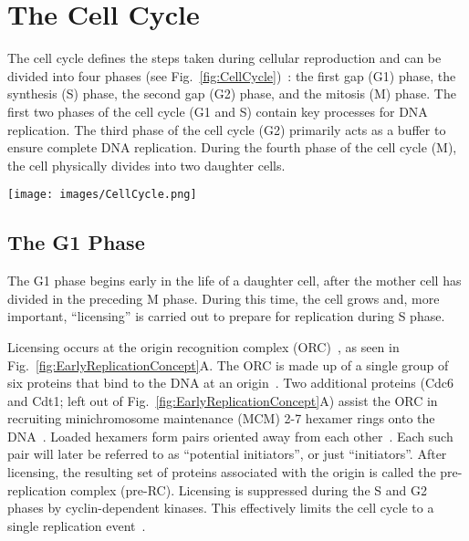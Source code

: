 	\section{The Cell Cycle}
	\label{sec:CellCycle}
	
	The cell cycle defines the steps taken during cellular reproduction and can be divided into four phases (see Fig.~\ref{fig:CellCycle})~\cite{MolecularCellBiology,CellMolApproach}:
	the first gap (G1) phase, the synthesis (S) phase, the second gap (G2) phase, and the mitosis (M) phase.
	The first two phases of the cell cycle (G1 and S) contain key processes for DNA replication.
	The third phase of the cell cycle (G2) primarily acts as a buffer to ensure complete DNA replication.
	During the fourth phase of the cell cycle (M), the cell physically divides into two daughter cells.
	
	\begin{SCfigure}[1][thb]
		\texttt{[image: images/CellCycle.png]}
		\caption[Cell Cycle]{\label{fig:CellCycle} The cell cycle has four phases: 
			Mitosis (M), when a mother cell separates into two daughter cells; 
			the first Gap (G1), when the daughter cell undergoes growth and chemical preparation for DNA replication;
			Synthesis (S), when the DNA is replicated;
			and the second Gap (G2), which acts as a buffer to ensure complete replication before the M phase.}
	\end{SCfigure}
	
	
		\subsection{The G1 Phase}
		\label{subsec:G1Phase}
		
		The G1 phase begins early in the life of a daughter cell, after the mother cell has divided in the preceding M phase.
		During this time, the cell grows and, more important, ``licensing'' is carried out to prepare for replication during S phase.
		
		Licensing occurs at the origin recognition complex (ORC)~\cite{DNAInitiation}, as seen in Fig.~\ref{fig:EarlyReplicationConcept}A.
		The ORC is made up of a single group of six proteins that bind to the DNA at an origin~\cite{ORC}.
		Two additional proteins (Cdc6 and Cdt1; left out of Fig.~\ref{fig:EarlyReplicationConcept}A) assist the ORC in recruiting minichromosome maintenance (MCM) 2-7 hexamer rings onto the DNA~\cite{DNARepInitiation}.
		Loaded hexamers form pairs oriented away from each other~\cite{MCMPairs}.
		Each such pair will later be referred to as ``potential initiators'', or just ``initiators''.
		After licensing, the resulting set of proteins associated with the origin is called the pre-replication complex (pre-RC).
		Licensing is suppressed during the S and G2 phases by cyclin-dependent kinases.
		This effectively limits the cell cycle to a single replication event~\cite{MolecularCellBiology}.
		

